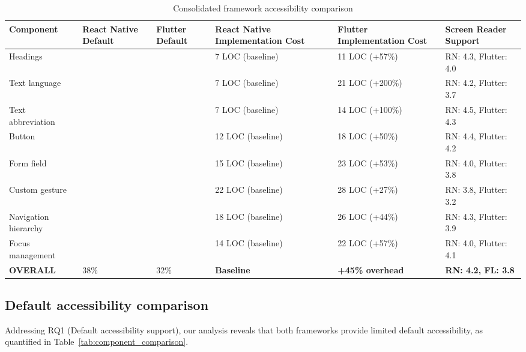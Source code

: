 \begin{table}[ht]
\caption{Consolidated framework accessibility comparison}
\label{tab:consolidated_comparison}
\centering
\begin{tabular}{|C{2.3cm}|C{1.7cm}|C{1.7cm}|C{2.3cm}|C{2.3cm}|C{2.3cm}|}
\hline
\textbf{Component} & \textbf{React Native Default} & \textbf{Flutter Default} & \textbf{React Native Implementation Cost} & \textbf{Flutter Implementation Cost} & \textbf{Screen Reader Support} \\
\hline
Headings &  &  & 7 LOC (baseline) & 11 LOC (+57\%) & RN: 4.3, Flutter: 4.0 \\
\hline
Text language &  &  & 7 LOC (baseline) & 21 LOC (+200\%) & RN: 4.2, Flutter: 3.7 \\
\hline
Text abbreviation &  &  & 7 LOC (baseline) & 14 LOC (+100\%) & RN: 4.5, Flutter: 4.3 \\
\hline
Button &  &  & 12 LOC (baseline) & 18 LOC (+50\%) & RN: 4.4, Flutter: 4.2 \\
\hline
Form field &  &  & 15 LOC (baseline) & 23 LOC (+53\%) & RN: 4.0, Flutter: 3.8 \\
\hline
Custom gesture &  &  & 22 LOC (baseline) & 28 LOC (+27\%) & RN: 3.8, Flutter: 3.2 \\
\hline
Navigation hierarchy &  &  & 18 LOC (baseline) & 26 LOC (+44\%) & RN: 4.3, Flutter: 3.9 \\
\hline
Focus management &  &  & 14 LOC (baseline) & 22 LOC (+57\%) & RN: 4.0, Flutter: 4.1 \\
\hline
\textbf{OVERALL} & 38\% & 32\% & \textbf{Baseline} & \textbf{+45\% overhead} & \textbf{RN: 4.2, FL: 3.8} \\
\hline
\end{tabular}
\end{table}

\subsection{Default accessibility comparison}
\label{subsec:default-accessibility}

Addressing RQ1 (Default accessibility support), our analysis reveals that both frameworks provide limited default accessibility, as quantified in Table~\ref{tab:component_comparison}.

